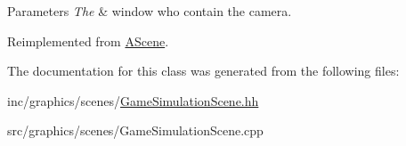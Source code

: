 \begin{DoxyParams}{Parameters}
{\em The} & window who contain the camera. \\
\hline
\end{DoxyParams}


Reimplemented from \hyperlink{classAScene_a18070899d965f1811c2253ad1d939374}{A\+Scene}.



The documentation for this class was generated from the following files\+:\begin{DoxyCompactItemize}
\item 
inc/graphics/scenes/\hyperlink{GameSimulationScene_8hh}{Game\+Simulation\+Scene.\+hh}\item 
src/graphics/scenes/Game\+Simulation\+Scene.\+cpp\end{DoxyCompactItemize}
